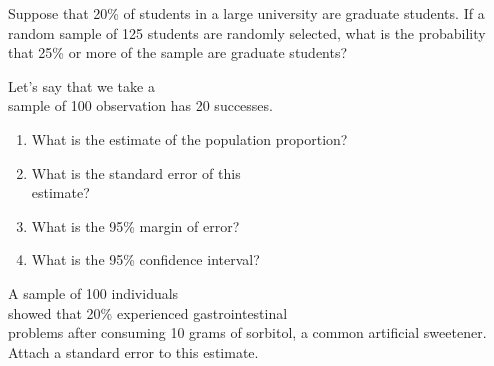 \documentclass[11pt, chapterprefix=true]{scrbook}\usepackage[]{graphicx}\usepackage[]{color}
\begin{document}
\begin{exercises}
\begin{exercise} %

Suppose that 20\% of students in a large university are graduate students.  If a random sample of 125 students are randomly selected, what is the probability that 25\% or more of the sample are graduate students?
\end{exercise}

\begin{exercise} %

Let's say that we take a \\ sample of 100 observation has 20 successes.

\begin{enumerate}
\item What is the estimate of the population proportion?
\item What is the standard error of this \\ estimate?
\item What is the 95\% margin of error?
\item What is the 95\% confidence interval?
\end{enumerate}

\end{exercise}
%

\begin{exercise} %

A sample of 100 individuals \\ showed that 20\% experienced gastrointestinal \\ problems  after consuming 10 grams of sorbitol, a common artificial sweetener.  Attach a standard error to this estimate.
\end{exercise}
\begin{solution} %



\end{solution}
\end{exercises}
\end{document}
